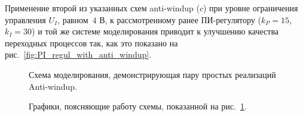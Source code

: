 \documentclass[12pt,a4paper,openany]{extarticle}
\begin{document}
Применение второй из указанных схем anti-windup ($c$) при уровне ограничения управления $U_I$, равном~$4\text{ В}$, к рассмотренному ранее ПИ-регулятору ($k_P = 15$, $k_I = 30$) и той же системе моделирования приводит к улучшению качества переходных процессов так, как это показано на рис.~\ref{fig:PI_regul_with_anti_windup}.

\begin{figure}[h!]
	\caption{Схема моделирования, демонстрирующая пару простых реализаций Anti-windup.}
	\label{fig:anti_windup_schemes}
\end{figure}	

\begin{figure}[h!]
	\vspace{-1cm}
	\caption{Графики, поясняющие работу схемы, показанной на рис.~\ref{fig:anti_windup_schemes}.}
	\label{fig:anti_windup_graphs}
\end{figure}	
\end{document}
